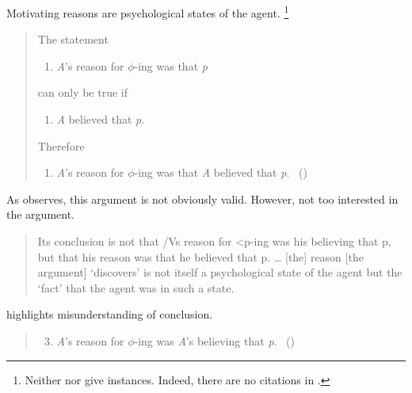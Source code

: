 \begin{note}
    Motivating reasons are psychological states of the agent.
  \citeauthor{Dancy:2000aa}%
  \footnote{
    Neither \citeauthor{Dancy:2000aa} nor \citeauthor{Collins:1997wn} give instances.
    Indeed, there are no citations in \textcite{Collins:1997wn}.
  }
  \begin{quote}
    The statement
    \begin{enumerate}[label=(\arabic*), ref=(\arabic*), nosep]
    \item%
      \emph{A}'s reason for \(\phi\)-ing was that \emph{p}
    \end{enumerate}
    can only be true if
    \begin{enumerate}[label=(\arabic*), ref=(\arabic*), resume, nosep]
    \item
      \emph{A} believed that \emph{p}.
    \end{enumerate}
    Therefore
    \begin{enumerate}[label=(\arabic*), ref=(\arabic*), resume, nosep]
    \item
      \emph{A}'s reason for \(\phi\)-ing was that \emph{A} believed that \emph{p}.%
      \mbox{ }\hfill\mbox{(\citeyear[102]{Dancy:2000aa})}
    \end{enumerate}
  \end{quote}
  As \citeauthor{Dancy:2000aa} observes, this argument is not obviously valid.
  However, not too interested in the argument.

  \begin{quote}
    Its conclusion is not that /Vs reason for <p-ing was his believing that p, but that his reason was that he believed that p.
    \dots
    [the] reason [the argument] `discovers' is not itself a psychological state of the agent but the `fact' that the agent was in such a state.
  \end{quote}

   \citeauthor{Dancy:2000aa} highlights misunderstanding of conclusion.

  \begin{quote}
    \begin{enumerate}[label=(\arabic*\(^{\ast}\)), ref=(\arabic*\(^{\ast}\))]
      \setcounter{enumi}{2}
    \item
      \emph{A}'s reason for \(\phi\)-ing was \emph{A}'s believing that \emph{p}.%
      \mbox{ }\hfill\mbox{(\citeyear[102]{Dancy:2000aa})}
    \end{enumerate}
  \end{quote}
\end{note}

